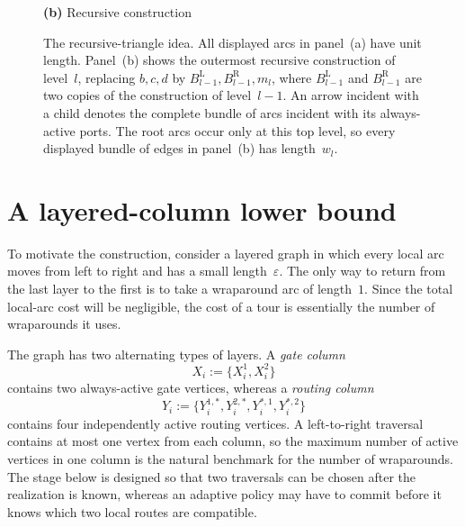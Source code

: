 \documentclass[12pt,a4paper,oneside]{report}
\begin{document}
\begin{figure}[htbp]
\begin{minipage}[c]{0.57\textwidth}

\smallskip
\textbf{(b)} Recursive construction
\end{minipage}
\caption{The recursive-triangle idea.  All displayed arcs in panel~(a) have
unit length.  Panel~(b) shows the outermost recursive construction of
level~$l$, replacing $b,c,d$ by
$B_{l-1}^{\mathrm L},B_{l-1}^{\mathrm R},m_l$, where
$B_{l-1}^{\mathrm L}$ and $B_{l-1}^{\mathrm R}$ are two copies of the
construction of level~$l-1$.  An arrow incident with a child denotes the
complete bundle of arcs incident with its always-active ports.  The root arcs
occur only at this top level, so every displayed bundle of edges in panel~(b)
has length~$w_l$.}
\label{fig:recursive-triangle-idea}
\end{figure}

\section{A layered-column lower bound}
\label{sec:layered-column-gap}

To motivate the construction, consider a layered graph in which every local
arc moves from left to right and has a small length~$\varepsilon$.  The only
way to return from the last layer to the first is to take a wraparound arc of
length~$1$.  Since the total local-arc cost will be negligible, the cost of a
tour is essentially the number of wraparounds it uses.

The graph has two alternating types of layers.  A \emph{gate column}
\[
    X_i:=\{X_i^1,X_i^2\}
\]
contains two always-active gate vertices, whereas a \emph{routing column}
\[
    Y_i:=\{Y_i^{1,\ast},Y_i^{2,\ast},Y_i^{\ast,1},Y_i^{\ast,2}\}
\]
contains four independently active routing vertices.  A left-to-right
traversal contains at most one vertex from each column, so the maximum number
of active vertices in one column is the natural benchmark for the number of
wraparounds.  The stage below is designed so that two traversals can be
chosen after the realization is known, whereas an adaptive policy may have
to commit before it knows which two local routes are compatible.
\end{document}
